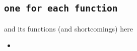\subsection{\texttt{one for each function}}
\label{}
and its functions (and shortcomings) here
\begin{itemize}
    \item
\end{itemize}

